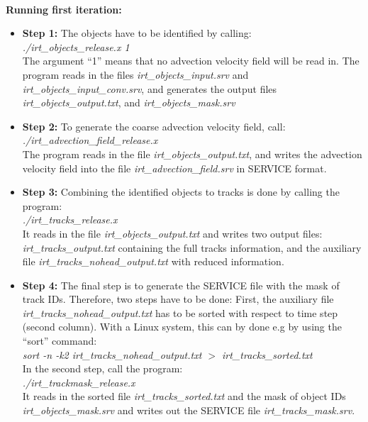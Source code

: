 \documentclass[11pt]{article}
\begin{document}
\vspace{0.5cm}\\
{\bf Running first iteration:}\\
\begin{itemize}
\item {\bf Step 1:} The objects have to be identified by calling:\\
{\it ./irt\_objects\_release.x 1}\\
The argument ``1'' means that no advection velocity field will be read in. The program reads in the files {\it irt\_objects\_input.srv} and {\it irt\_objects\_input\_conv.srv}, and generates the output files {\it irt\_objects\_output.txt}, and {\it irt\_objects\_mask.srv}
\item {\bf Step 2:} To generate the coarse advection velocity field, call:\\
{\it ./irt\_advection\_field\_release.x}\\
The program reads in the file {\it irt\_objects\_output.txt}, and writes the advection velocity field into the file {\it irt\_advection\_field.srv} in SERVICE format.
\item {\bf Step 3:} Combining the identified objects to tracks is done by calling the program:\\
{\it ./irt\_tracks\_release.x}\\
It reads in the file {\it irt\_objects\_output.txt} and writes two output files: {\it irt\_tracks\_output.txt} containing the full tracks information, and the auxiliary file {\it irt\_tracks\_nohead\_output.txt} with reduced information.
\item {\bf Step 4:} The final step is to generate the SERVICE file with the mask of track IDs. Therefore, two steps have to be done: First, the auxiliary file {\it irt\_tracks\_nohead\_output.txt} has to be sorted with respect to time step (second column). With a Linux system, this can by done e.g by using the ``sort'' command:\\
{\it sort -n -k2 irt\_tracks\_nohead\_output.txt $>$ irt\_tracks\_sorted.txt}\\
In the second step, call the program:\\
{\it ./irt\_trackmask\_release.x}\\
It reads in the sorted file {\it irt\_tracks\_sorted.txt} and the mask of object IDs {\it irt\_objects\_mask.srv} and writes out the SERVICE file {\it irt\_tracks\_mask.srv}.
\end{itemize}\vspace{0.5cm}
\end{document}
